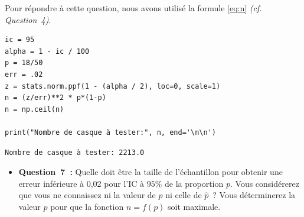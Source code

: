 \noindent
Pour répondre à cette question, nous avons utilisé la formule \ref*{eq:n} \textit{(cf. Question~4)}.

\vspace{.2cm}


\begin{lstlisting}[style=myPython, caption=Code Python question 6, frame=lines]
ic = 95
alpha = 1 - ic / 100
p = 18/50
err = .02
z = stats.norm.ppf(1 - (alpha / 2), loc=0, scale=1)
n = (z/err)**2 * p*(1-p)
n = np.ceil(n)

print("Nombre de casque à tester:", n, end='\n\n')
\end{lstlisting}

\begin{lstlisting}[style=myLog, caption=Résultat du code, frame=lines]
Nombre de casque à tester: 2213.0
\end{lstlisting}

\vspace{.5cm}


\begin{itemize}[label={},itemindent=-2em,leftmargin=2em]
    \item \textbf{Question~7~:} Quelle doit être la taille de l’échantillon pour obtenir une erreur inférieure à 0,02 pour
    l’IC à $95\%$ de la proportion $p$. Vous considérerez que vous ne connaissez ni la valeur de $p$ ni celle
    de $\hat{p}$~? Vous déterminerez la valeur $p$ pour que la fonction $n=f(p)$ soit maximale.
\end{itemize}

